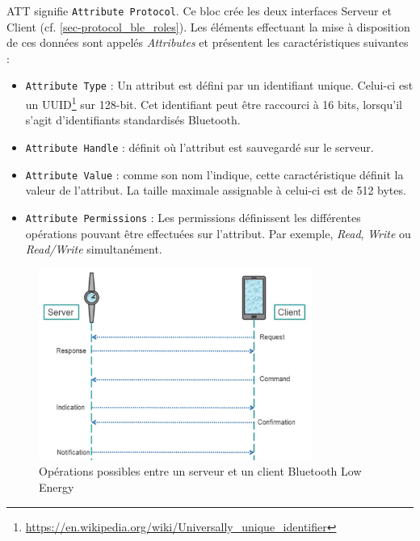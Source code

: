 
ATT signifie \texttt{Attribute Protocol}. Ce bloc crée les deux interfaces Serveur et Client (cf. \cref{sec-protocol_ble_roles}). Les éléments effectuant la mise à disposition de ces données sont appelés \textit{Attributes} et présentent les caractéristiques suivantes : 
\begin{itemize}
    \item \texttt{Attribute Type} : Un attribut est défini par un identifiant unique. Celui-ci est un UUID\footnote{\url{https://en.wikipedia.org/wiki/Universally_unique_identifier}} sur 128-bit. Cet identifiant peut être raccourci à 16 bits, lorsqu'il s'agit d'identifiants standardisés Bluetooth.
    \item \texttt{Attribute Handle} : définit où l'attribut est sauvegardé sur le serveur.
    \item \texttt{Attribute Value} : comme son nom l'indique, cette caractéristique définit la valeur de l'attribut. La taille maximale assignable à celui-ci est de 512 bytes.
    \item \texttt{Attribute Permissions} : Les permissions définissent les différentes opérations pouvant être effectuées sur l'attribut. Par exemple, \textit{Read}, \textit{Write} ou \textit{Read/Write} simultanément.
\end{itemize}

\begin{figure}[ht!]
\centering
\includegraphics[width=0.8\textwidth]{Figures/Protocols/Bluetooth/client_server_4_operations.png}
\caption{Opérations possibles entre un serveur et un client Bluetooth Low Energy}
\label{fig-client_server_4_operations}
\end{figure}


